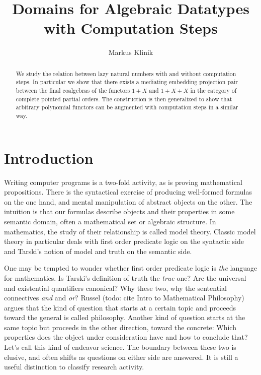 \documentclass[a4paper]{article}
\begin{document}
\title{Domains for Algebraic Datatypes with Computation Steps}
\author{Markus Klinik}
\maketitle

\begin{abstract}

We study the relation between lazy natural numbers with and without computation
steps. In particular we show that there exists a mediating em\-bed\-ding
projection pair between the final coalgebras of the functors $1+X$ and $1+X+X$
in the category of complete pointed partial orders. The construction is then
generalized to show that arbitrary polynomial functors can be augmented with
computation steps in a similar way.

\end{abstract}

\section{Introduction}

Writing computer programs is a two-fold activity, as is proving mathematical
propositions. There is the syntactical exercise of producing well-formed
formulas on the one hand, and mental manipulation of abstract objects on the
other. The intuition is that our formulas describe objects and their properties
in some semantic domain, often a mathematical set or algebraic structure. In
mathematics, the study of their relationship is called model theory.  Classic
model theory in particular deals with first order predicate logic on the
syntactic side and Tarski's notion of model and truth on the semantic side.

One may be tempted to wonder whether first order predicate logic is \emph{the}
language for mathematics. Is Tarski's definition of truth the \emph{true} one?
Are the universal and existential quantifiers canonical? Why these two, why the
sentential connectives \emph{and} and \emph{or}? Russel (todo: cite Intro to
Mathematical Philosophy) argues that the kind of question that starts at a
certain topic and proceeds toward the general is called philosophy. Another kind
of question starts at the same topic but proceeds in the other direction,
toward the concrete: Which properties does the object under consideration have
and how to conclude that? Let's call this kind of endeavor science. The boundary
between these two is elusive, and often shifts as questions on either side are
answered. It is still a useful distinction to classify research
activity.
\end{document}
